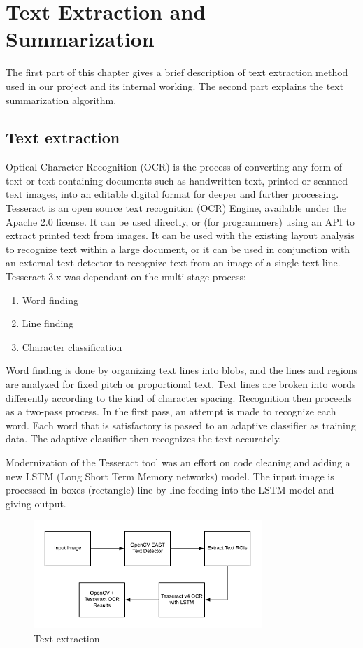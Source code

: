 \chapter{Text Extraction and Summarization}

\indent\indent The first part of this chapter gives a brief description of text extraction method used in our project and its internal working. The second part explains the text summarization algorithm.  
\section{Text extraction}
Optical Character Recognition (OCR) is the process of
converting any form of text or text-containing documents such as handwritten text, printed or scanned text images, into an editable digital format for deeper and further processing. \cite{hamad2016detailed}
Tesseract is an open source text recognition (OCR) Engine, available under the Apache 2.0 license. It can be used directly, or (for programmers) using an API to extract printed text from images. It can be used with the existing layout analysis to recognize text within a large document, or it can be used in conjunction with an external text detector to recognize text from an image of a single text line.\\
Tesseract 3.x was dependant on the multi-stage process:
\begin{enumerate}
    \item Word finding
    \item Line finding
    \item Character classification
\end{enumerate}

Word finding is done by organizing text lines into blobs, and the lines and regions are analyzed for fixed pitch or proportional text. Text lines are broken into words differently according to the kind of character spacing. Recognition then proceeds as a two-pass process. In the first pass, an attempt is made to recognize each word. Each word that is satisfactory is passed to an adaptive classifier as training data. The adaptive classifier then recognizes the text accurately.

Modernization of the Tesseract tool was an effort on code cleaning and adding a new LSTM (Long Short Term Memory networks) model. The input image is processed in boxes (rectangle) line by line feeding into the LSTM model and giving output. 

\begin{figure}[H]
\centering
	\includegraphics[scale=1]{Figures/extract.png}	
	\caption{Text extraction}
	\label{fig:extract}
\end{figure}

